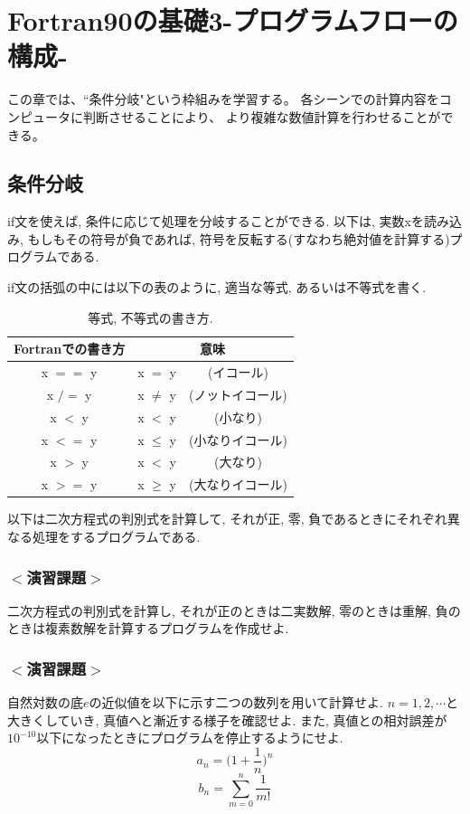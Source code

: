 \documentclass[a4j]{jsbook}
\begin{document}
\chapter{Fortran90の基礎3-プログラムフローの構成-}
この章では、``条件分岐"という枠組みを学習する。
各シーンでの計算内容をコンピュータに判断させることにより、
より複雑な数値計算を行わせることができる。

\section{条件分岐}
if文を使えば, 条件に応じて処理を分岐することができる.
以下は, 実数xを読み込み, もしもその符号が負であれば,
符号を反転する(すなわち絶対値を計算する)プログラムである.

if文の括弧の中には以下の表のように, 適当な等式, あるいは不等式を書く.

\begin{table}[h]
  \caption{等式, 不等式の書き方. }
  \begin{center}
    \begin{tabular}{ccc}
      \hline
      Fortranでの書き方   & \multicolumn{2}{c}{意味} \\ \hline
      x $==$ y   & x $=$ y &(イコール)\\
      x $/=$ y   & x $\ne$ y &(ノットイコール)\\
      x $<$ y   & x $<$ y &(小なり)\\
      x $<=$ y  & x $\le$ y &(小なりイコール)\\
      x $>$ y  & x $<$ y &(大なり)\\
      x $>=$ y   & x $\ge$ y &(大なりイコール)\\ \hline
    \end{tabular}
  \end{center}
\end{table}


以下は二次方程式の判別式を計算して, それが正, 零, 負であるときにそれぞれ異なる処理をするプログラムである.


\subsection*{$<$演習課題$>$}
二次方程式の判別式を計算し, それが正のときは二実数解,
零のときは重解, 負のときは複素数解を計算するプログラムを作成せよ.

\subsection*{$<$演習課題$>$}
自然対数の底$e$の近似値を以下に示す二つの数列を用いて計算せよ.
$n=1, 2, \cdots$と大きくしていき, 真値へと漸近する様子を確認せよ.
また, 真値との相対誤差が$10^{-10}$以下になったときにプログラムを停止するようにせよ.
\begin{equation}
a_n= \Big( 1+\frac{1}{n}\Big)^n
\end{equation}
\begin{equation}
b_n=\sum_{m=0}^{n}\frac{1}{m!}
\end{equation}
\end{document}
